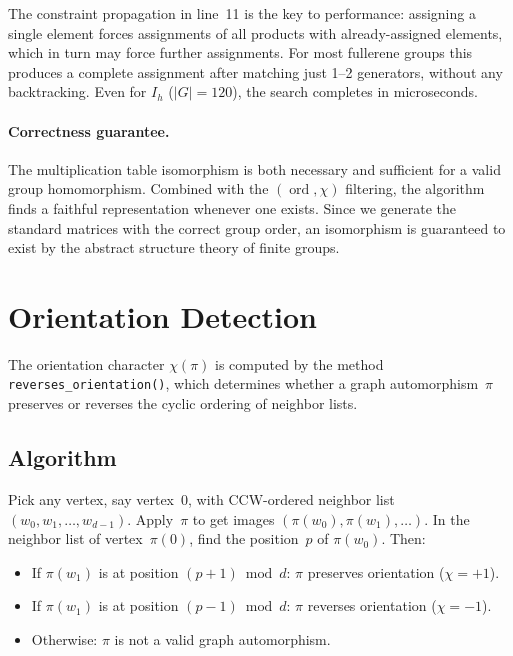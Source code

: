 \documentclass[11pt]{article}
\DeclareMathOperator{\ord}{ord}
\begin{document}
The constraint propagation in line~11 is the key to performance:
assigning a single element forces assignments of all products with
already-assigned elements, which in turn may force further assignments.
For most fullerene groups this produces a complete assignment after
matching just 1--2 generators, without any backtracking.  Even for
$I_h$ ($|G| = 120$), the search completes in microseconds.

\paragraph{Correctness guarantee.}
The multiplication table isomorphism is both necessary and sufficient
for a valid group homomorphism.  Combined with the $(\ord, \chi)$
filtering, the algorithm finds a faithful representation whenever one
exists.  Since we generate the standard matrices with the correct group
order, an isomorphism is guaranteed to exist by the abstract structure
theory of finite groups.

\section{Orientation Detection}
\label{sec:orientation}

The orientation character $\chi(\pi)$ is computed by the method
\texttt{reverses\_orientation()}, which determines whether a graph
automorphism~$\pi$ preserves or reverses the cyclic ordering of neighbor
lists.

\subsection{Algorithm}

Pick any vertex, say vertex~0, with CCW-ordered neighbor list
$(w_0, w_1, \ldots, w_{d-1})$.  Apply~$\pi$ to get images
$(\pi(w_0), \pi(w_1), \ldots)$.  In the neighbor list of
vertex~$\pi(0)$, find the position~$p$ of $\pi(w_0)$.  Then:
\begin{itemize}
  \item If $\pi(w_1)$ is at position $(p+1) \bmod d$: $\pi$ preserves
    orientation ($\chi = +1$).
  \item If $\pi(w_1)$ is at position $(p-1) \bmod d$: $\pi$ reverses
    orientation ($\chi = -1$).
  \item Otherwise: $\pi$ is not a valid graph automorphism.
\end{itemize}
\end{document}
